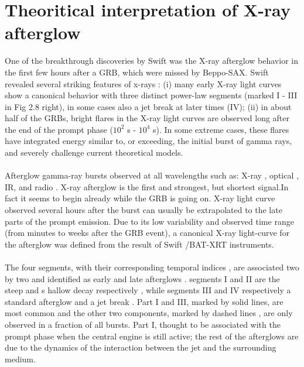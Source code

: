 \section{ Theoritical  interpretation  of  X-ray  afterglow }
One of the breakthrough discoveries by Swift was the X-ray afterglow behavior in the first few hours after a GRB, which were missed by Beppo-SAX. Swift revealed several striking features of x-rays : (i) many early X-ray light curves show a canonical behavior with three distinct  power-law  segments (marked I - III in Fig 2.8 right), in some cases also a jet break at later times (IV); (ii) in about half of the GRBs, bright flares in the X-ray light curves are observed long after the end of the prompt
phase ($ 10^{2} $ s - $ 10^{4} $ s). In some extreme cases, these flares have integrated energy similar to, or exceeding, the initial burst of gamma rays, and severely challenge current theoretical models.\citep{26}\\\\
Afterglow gamma-ray bursts  observed at all wavelengths such as: X-ray , optical ,  IR, and radio . X-ray afterglow is the first and strongest, but shortest signal.In fact it seems to begin already while the GRB is going on. X-ray light curve observed several hours after the burst can usually be extrapolated to the late parts of the prompt emission. Due to  its low variability and observed time range (from minutes to weeks after the GRB event), a canonical X-ray light-curve for the afterglow was defined from the result of Swift /BAT-XRT instruments.\citep{27}\citep{28}\\\\
 The four  segments, with  their  corresponding  temporal  indices , are  associated two   by  two  and  identified  as  early   and late   afterglows . segments  I  and  II  are  the  steep  and s hallow  decay  respectively  , while  segments   III and  IV   respectively  a standard   afterglow  and   a jet  break . Part I  and III, marked  by   solid  lines, are most common   and  the  other two  components, marked by  dashed  lines , are  only  observed  in  a fraction  of  all bursts. Part I, thought  to  be  associated   with the  prompt   phase   when   the   central  engine  is  still  active; the rest of the  afterglows  are  due  to  the  dynamics  of  the  interaction  between  the jet and  the  surrounding   medium. \citep{30}\citep{31} \citep{32}\\\\
